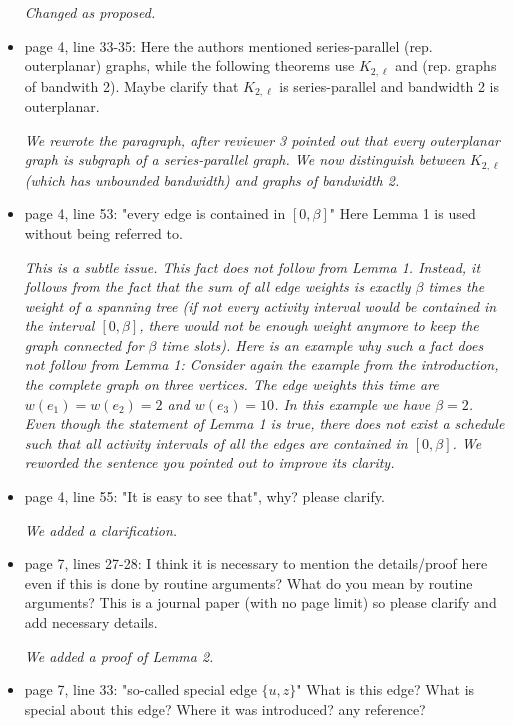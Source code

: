 \documentclass[11pt,a4paper]{article}
\begin{document}
\begin{itemize}
\textit{Changed as proposed.}

\item page 4, line 33-35: Here the authors mentioned series-parallel (rep. outerplanar) graphs, while the following theorems use $K_{2,\ell}$ and (rep. graphs of bandwith 2). Maybe clarify that $K_{2,\ell}$ is series-parallel and bandwidth 2 is outerplanar.

\textit{We rewrote the paragraph, after reviewer 3 pointed out that every outerplanar graph is subgraph of a series-parallel graph. We now distinguish between $K_{2,\ell}$ (which has unbounded bandwidth) and graphs of bandwidth 2.}

\item page 4, line 53: "every edge is contained in $[0, \beta]$" Here Lemma 1 is used without being referred to.

\textit{This is a subtle issue. This fact does not follow from Lemma 1. Instead, it follows from the fact that the sum of all edge weights is exactly $\beta$ times the weight of a spanning tree (if not every activity interval would be contained in the interval $[0, \beta]$, there would not be enough weight anymore to keep the graph connected for $\beta$ time slots). Here is an example why such a fact does not follow from Lemma 1: Consider again the example from the introduction, the complete graph on three vertices. The edge weights this time are $w(e_1) = w(e_2) = 2$ and $w(e_3) = 10$. In this example we have $\beta = 2$. Even though the statement of Lemma 1 is true, there does not exist a schedule such that all activity intervals of all the edges are contained in $[0, \beta]$. We reworded the sentence you pointed out to improve its clarity.}

\item page 4, line 55: "It is easy to see that", why? please clarify.

\textit{We added a clarification.}

\item page 7, lines 27-28: I think it is necessary to mention the details/proof here even if this is done by routine arguments? What do you mean by routine arguments? This is a journal paper (with no page limit) so please clarify and add necessary details.

\textit{We added a proof of Lemma 2.}

\item page 7, line 33: "so-called special edge $\{u, z\}$" What is this edge? What is special about this edge? Where it was introduced? any reference? 


\end{itemize}
\end{document}
